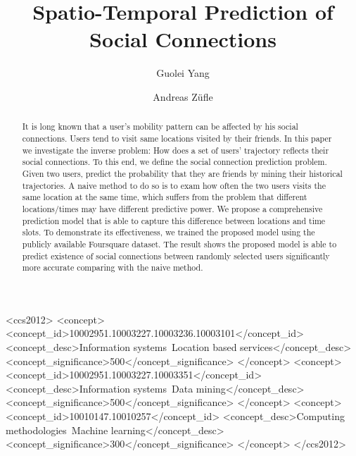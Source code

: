 \documentclass[sigconf]{acmart}
\begin{document}



\title{Spatio-Temporal Prediction of Social Connections}


\author{Guolei Yang}

\author{Andreas Z\"ufle}


\begin{abstract}
It is long known that a user's mobility pattern can be affected by his social connections. Users tend to visit same locations visited by their friends. In this paper we investigate the inverse problem: How does a set of users' trajectory reflects their social connections. To this end, we define the social connection prediction problem. Given two users, predict the probability that they are friends by mining their historical trajectories. A naive method to do so is to exam how often the two users visits the same location at the same time, which suffers from the problem that different locations/times may have different predictive power. We propose a comprehensive prediction model that is able to capture this difference between locations and time slots. To demonstrate its effectiveness, we trained the proposed model using the publicly available Foursquare dataset. The result shows the proposed model is able to predict existence of social connections between randomly selected users significantly more accurate comparing with the naive method.
\end{abstract}


\begin{CCSXML}
<ccs2012>
<concept>
<concept_id>10002951.10003227.10003236.10003101</concept_id>
<concept_desc>Information systems~Location based services</concept_desc>
<concept_significance>500</concept_significance>
</concept>
<concept>
<concept_id>10002951.10003227.10003351</concept_id>
<concept_desc>Information systems~Data mining</concept_desc>
<concept_significance>500</concept_significance>
</concept>
<concept>
<concept_id>10010147.10010257</concept_id>
<concept_desc>Computing methodologies~Machine learning</concept_desc>
<concept_significance>300</concept_significance>
</concept>
</ccs2012>
\end{CCSXML}
\end{document}
